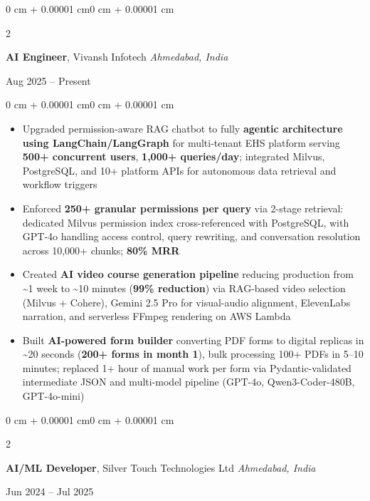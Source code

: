 \documentclass[10pt, letterpaper]{article}
\newenvironment{highlights}{
    \begin{itemize}[
        topsep=0.01 cm,
        parsep=0.01 cm,
        partopsep=0pt,
        itemsep=0pt,
        leftmargin=0 cm + 10pt
    ]
}{
    \end{itemize}
}
\newenvironment{onecolentry}{
    \begin{adjustwidth}{0 cm + 0.00001 cm}{0 cm + 0.00001 cm}
}{
    \end{adjustwidth}
}
\newenvironment{twocolentry}[2][]{
    \onecolentry
    \def\secondColumn{#2}
    \setcolumnwidth{\fill, 5.5 cm}
    \begin{paracol}{2}
}{
    \switchcolumn \raggedleft \secondColumn
    \end{paracol}
    \endonecolentry
}
\begin{document}
        \begin{twocolentry}{
            Aug 2025 -- Present
        }
            \textbf{AI Engineer}, Vivansh Infotech \hfill \textit{Ahmedabad, India}
        \end{twocolentry}

        \vspace{0.02 cm}
        \begin{onecolentry}
            \begin{highlights}
                \item Upgraded permission-aware RAG chatbot to fully \textbf{agentic architecture using LangChain/LangGraph} for multi-tenant EHS platform serving \textbf{500+ concurrent users}, \textbf{1,000+ queries/day}; integrated Milvus, PostgreSQL, and 10+ platform APIs for autonomous data retrieval and workflow triggers
                \item Enforced \textbf{250+ granular permissions per query} via 2-stage retrieval: dedicated Milvus permission index cross-referenced with PostgreSQL, with GPT-4o handling access control, query rewriting, and conversation resolution across 10,000+ chunks; \textbf{80\% MRR}
                \item Created \textbf{AI video course generation pipeline} reducing production from \textasciitilde1 week to \textasciitilde10 minutes (\textbf{99\% reduction}) via RAG-based video selection (Milvus + Cohere), Gemini 2.5 Pro for visual-audio alignment, ElevenLabs narration, and serverless FFmpeg rendering on AWS Lambda
                \item Built \textbf{AI-powered form builder} converting PDF forms to digital replicas in \textasciitilde20 seconds (\textbf{200+ forms in month 1}), bulk processing 100+ PDFs in 5--10 minutes; replaced 1+ hour of manual work per form via Pydantic-validated intermediate JSON and multi-model pipeline (GPT-4o, Qwen3-Coder-480B, GPT-4o-mini)
            \end{highlights}
        \end{onecolentry}

        \vspace{0.05 cm}

        \begin{twocolentry}{
            Jun 2024 -- Jul 2025
        }
            \textbf{AI/ML Developer}, Silver Touch Technologies Ltd \hfill \textit{Ahmedabad, India}
        \end{twocolentry}
\end{document}
